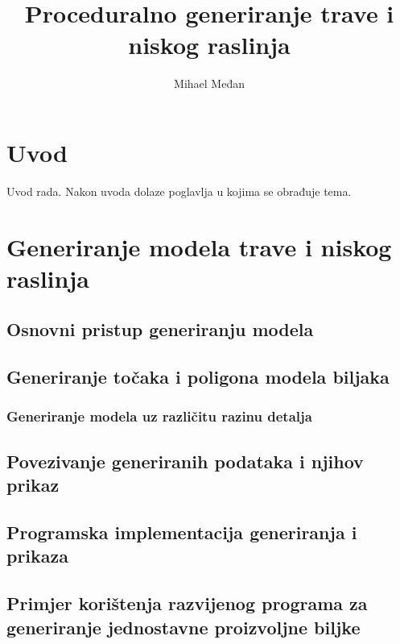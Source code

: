 \documentclass[times, utf8, diplomski]{fer}
\begin{document}

\title{Proceduralno generiranje trave i niskog raslinja}
\author{Mihael Međan}

\maketitle



\zahvala{}

\tableofcontents

\chapter{Uvod}
Uvod rada. Nakon uvoda dolaze poglavlja u kojima se obrađuje tema.

\chapter{Generiranje modela trave i niskog raslinja}
\section{Osnovni pristup generiranju modela}

\section{Generiranje točaka i poligona modela biljaka}

\subsection{Generiranje modela uz različitu razinu detalja}

\section{Povezivanje generiranih podataka i njihov prikaz}

\section{Programska implementacija generiranja i prikaza}

\section{Primjer korištenja razvijenog programa za generiranje jednostavne proizvoljne biljke}
\end{document}
